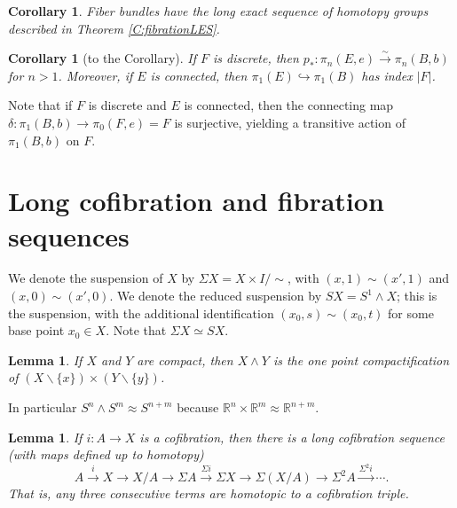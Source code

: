\documentclass[12pt]{article}
\theoremstyle{plain}
\newtheorem{lemma}[equation]{Lemma}
\newtheorem{corollary}[equation]{Corollary}
\theoremstyle{definition}
\theoremstyle{remark}
\newcommand{\RR}{\ensuremath{\mathbb{R}}}
\begin{document}
 \begin{corollary}
   Fiber bundles have the long exact sequence of homotopy groups described in Theorem
   \ref{C:fibrationLES}.
 \end{corollary}
 \begin{corollary}[to the Corollary]
   If $F$ is discrete, then $p_*:\pi_n(E,e)\xrightarrow{\sim} \pi_n(B,b)$ for $n>1$.
   Moreover, if $E$ is connected, then $\pi_1(E)\hookrightarrow \pi_1(B)$ has index
   $|F|$.
 \end{corollary}
 Note that if $F$ is discrete and $E$ is connected, then the connecting map $\delta:
 \pi_1(B,b)\to \pi_0(F,e)=F$ is surjective, yielding a transitive action of $\pi_1(B,b)$
 on $F$.

 \section{Long cofibration and fibration sequences}
 We denote the suspension of $X$ by $\Sigma X=X\times I/\sim$, with $(x,1)\sim (x',1)$
 and $(x,0)\sim (x',0)$. We denote the reduced suspension by $SX=S^1\wedge X$; this is
 the suspension, with the additional identification $(x_0,s)\sim (x_0,t)$ for some base
 point $x_0\in X$. Note that $\Sigma X\simeq SX$.
 \begin{lemma}
   If $X$ and $Y$ are compact, then $X\wedge Y$ is the one point compactification of
   $(X\smallsetminus \{x\})\times (Y\smallsetminus \{y\})$.
 \end{lemma}
 In particular $S^n\wedge S^m\approx S^{n+m}$ because $\RR^n\times \RR^m\approx
 \RR^{n+m}$.
 \begin{lemma}
   If $i:A\to X$ is a cofibration, then there is a long cofibration sequence (with maps
   defined up to homotopy)
   \[
    A\xrightarrow{i} X\to X/A \to \Sigma A \xrightarrow{\Sigma i} \Sigma X\to \Sigma
    (X/A) \to \Sigma^2 A\xrightarrow{\Sigma^2 i}\cdots.
   \]
   That is, any three consecutive terms are \emph{homotopic} to a cofibration triple.
 \end{lemma}
\end{document}
